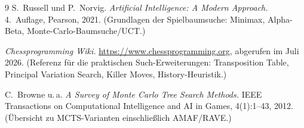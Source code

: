 \documentclass[11pt,a4paper]{article}
\begin{document}
\begin{thebibliography}{9}
S.~Russell und P.~Norvig.
\emph{Artificial Intelligence: A Modern Approach.}
4.~Auflage, Pearson, 2021.
(Grundlagen der Spielbaumsuche: Minimax, Alpha-Beta, Monte-Carlo-Baumsuche/UCT.)

\emph{Chessprogramming Wiki.}
\url{https://www.chessprogramming.org}, abgerufen im Juli 2026.
(Referenz f\"ur die praktischen Such-Erweiterungen: Transposition Table,
Principal Variation Search, Killer Moves, History-Heuristik.)

C.~Browne u.\,a.
\emph{A Survey of Monte Carlo Tree Search Methods.}
IEEE Transactions on Computational Intelligence and AI in Games,
4(1):1--43, 2012.
(\"Ubersicht zu MCTS-Varianten einschlie\ss lich AMAF/RAVE.)
\end{thebibliography}
\end{document}
